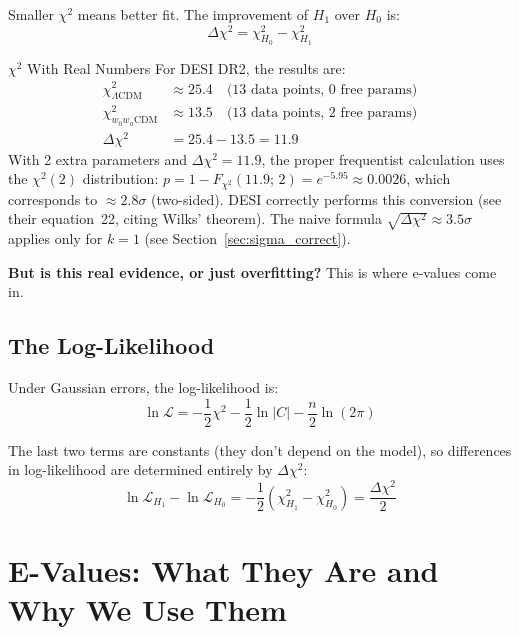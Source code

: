\documentclass[11pt,a4paper]{article}
\newcommand{\LCDM}{$\Lambda$CDM}
\begin{document}
Smaller $\chi^2$ means better fit. The improvement of $H_1$ over $H_0$ is:
\begin{equation}
\Delta\chi^2 = \chi^2_{H_0} - \chi^2_{H_1}
\end{equation}

\begin{examplebox}{$\chi^2$ With Real Numbers}
For DESI DR2, the results are:
\begin{align}
\chi^2_{\text{\LCDM}} &\approx 25.4 \quad \text{(13 data points, 0 free params)} \\
\chi^2_{w_0w_a\text{CDM}} &\approx 13.5 \quad \text{(13 data points, 2 free params)} \\
\Delta\chi^2 &= 25.4 - 13.5 = 11.9
\end{align}
With 2 extra parameters and $\Delta\chi^2 = 11.9$, the proper frequentist calculation uses the $\chi^2(2)$ distribution: $p = 1 - F_{\chi^2}(11.9;\, 2) = e^{-5.95} \approx 0.0026$, which corresponds to $\approx 2.8\sigma$ (two-sided). DESI correctly performs this conversion (see their equation~22, citing Wilks' theorem). The naive formula $\sqrt{\Delta\chi^2} \approx 3.5\sigma$ applies only for $k=1$ (see Section~\ref{sec:sigma_correct}).

\textbf{But is this real evidence, or just overfitting?} This is where e-values come in.
\end{examplebox}

\subsection{The Log-Likelihood}

Under Gaussian errors, the log-likelihood is:
\begin{equation}
\ln \mathcal{L} = -\frac{1}{2}\chi^2 - \frac{1}{2}\ln|C| - \frac{n}{2}\ln(2\pi)
\label{eq:loglike}
\end{equation}

The last two terms are constants (they don't depend on the model), so differences in log-likelihood are determined entirely by $\Delta\chi^2$:
\begin{equation}
\ln\mathcal{L}_{H_1} - \ln\mathcal{L}_{H_0} = -\frac{1}{2}(\chi^2_{H_1} - \chi^2_{H_0}) = \frac{\Delta\chi^2}{2}
\end{equation}


\section{E-Values: What They Are and Why We Use Them}
\label{sec:evalues}
\end{document}
